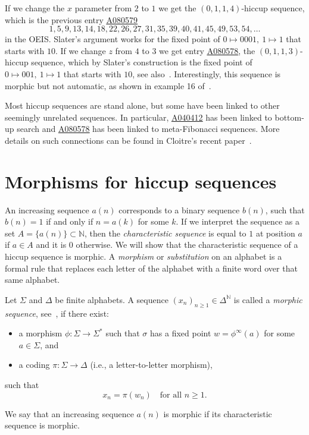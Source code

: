 \documentclass[12pt,reqno]{article}
\newcommand{\seqnum}[1]{\href{https://oeis.org/#1}{\rm \underline{#1}}}
\begin{document}
If we change the $x$ parameter from $2$ to $1$ we get the $(0,1,1,4)$-hiccup sequence,
which is the previous entry \seqnum{A080579}
\[
1, 5, 9, 13, 14, 18, 22, 26, 27, 31, 35, 39, 40, 41, 45, 49, 53, 54, \ldots
\]
in the OEIS. Slater's argument works for the fixed point of $0\mapsto 0001,\ 1\mapsto 1$ that starts
with $10$. If we change $z$ from $4$ to $3$ we get entry \seqnum{A080578}, the $(0,1,1,3)$-hiccup sequence,
which by Slater's construction is the fixed point of $0\mapsto 001,\ 1\mapsto 1$ that starts with $10$,
see also~\cite{ruskey2006}. Interestingly, this sequence is morphic but not automatic, as shown in
example 16 of~\cite{allouche2022}. 

Most hiccup sequences are stand alone, but some have been linked to other seemingly unrelated
sequences. In particular, 
\seqnum{A040412} has been linked to bottom-up search and
\seqnum{A080578} has been linked to meta-Fibonacci sequences.
More details on such connections can be found in Cloitre's recent paper~\cite{cloitre2025}.


\section{Morphisms for hiccup sequences}

An increasing sequence $a(n)$ corresponds to a binary sequence $b(n)$, such that $b(n)=1$
if and only if $n=a(k)$ for some $k$. 
If we interpret the sequence as a set $A=\{a(n)\}\subset \mathbb N$, then    
the \emph{characteristic sequence} is equal to $1$
at position $a$ if $a\in A$ and it is $0$ otherwise.
We will show that the characteristic sequence of a hiccup
sequence is morphic. 
A \emph{morphism} or \emph{substitution} on an alphabet is a formal rule that replaces each letter of the alphabet with a finite word over that same alphabet. 
\begin{definition}\label{def:1}
Let $\Sigma$ and $\Delta$ be finite alphabets. A sequence $(x_n)_{n \geq 1} \in \Delta^{\mathbb{N}}$ is called a \emph{morphic sequence}, see~\cite[Ch. 7]{alloucheshallit}, if there exist:

\begin{itemize}
  \item a morphism $\phi : \Sigma \to \Sigma^*$ such that $\sigma$ has a fixed point $w = \phi^\infty(a)$ for some $a \in \Sigma$, and
  \item a coding $\pi : \Sigma \to \Delta$ (i.e., a letter-to-letter morphism),
\end{itemize}

such that
\[
x_n = \pi(w_n) \quad \text{for all } n \geq 1.
\]
\end{definition}
\noindent We say that an increasing sequence $a(n)$ is morphic if its characteristic
sequence is morphic.
\end{document}
